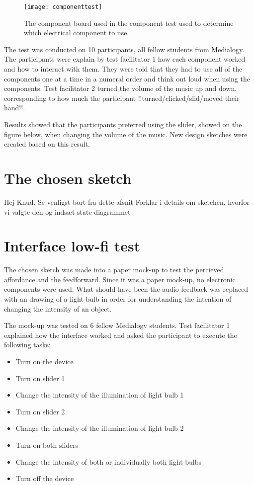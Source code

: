 \begin{figure}[!h] 
\centering
\texttt{[image: componenttest]}
\caption{\label{fig:componenttest} The component board used in the component test used to determine which electrical component to use.}
\end{figure}

The test was conducted on 10 participants, all fellow students from Medialogy. The participants were explain by test facilitator 1 how each component worked and how to interact with them. They were told that they had to use all of the components one at a time in a numeral order and think out loud when using the components. Test facilitator 2 turned the volume of the music up and down, corresponding to how much the participant !!turned/clicked/slid/moved their hand!!.

Results showed that the participants preferred using the slider, showed on the figure below, when changing the volume of the music. New design sketches were created based on this result.

\section{The chosen sketch}
Hej Knud. Se venligst bort fra dette afsnit
Forklar i details om sketchen, hvorfor vi valgte den og indsæt state diagrammet

\section{Interface low-fi test}
The chosen sketch was made into a paper mock-up to test the  percieved affordance and the  feedforward. Since it was a paper mock-up, no electronic components were used. What should have been the audio feedback was replaced with an drawing of a light bulb in order for understanding the intention of changing the intensity of an object. 

The mock-up was tested on 6 fellow Medialogy students. Test facilitator 1 explained how the interface worked and asked the participant to execute the following tasks:

\begin{itemize}
\item Turn on the device
\item Turn on slider 1
\item Change the intensity of the illumination of light bulb 1
\item Turn on slider 2
\item Change the intensity of the illumination of light bulb 2
\item Turn on both sliders
\item Change the intensity of both or individually both light bulbs
\item Turn off the device
\end{itemize}

